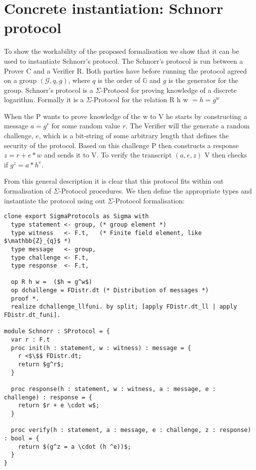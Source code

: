 \section{Concrete instantiation: Schnorr protocol}
\label{sec:schnorr}
To show the workability of the proposed formalisation we show that it can be
used to instantiate Schnorr's protocol.
The Schnorr's protocol is run between a Prover C and a
Verifier R. Both parties have before running the protocol agreed on a group
$(\mathcal{G}, q, g)$, where $q$ is the order of $\mathbb{G}$ and $g$ is the
generator for the group.
Schnorr's protocol is a $\Sigma$-Protocol for proving knowledge of a discrete
logarithm. Formally it is a $\Sigma$-Protocol for the relation R h w $= h = g^{w}$

When the P wants to prove knowledge of the w to V he starts by
constructing a message $a = g^{r}$ for some random value $r$. The Verifier will
the generate a random challenge, $e$, which is a bit-string of some arbitrary length
that defines the security of the protocol.
Based on this challenge P then constructs a response $z = r + e * w$ and sends
it to V.
To verify the transcript $(a,e,z)$ V then checks if $g^{z} = a * h^{e}$.

From this general description it is clear that this protocol fits within out
formalisation of $\Sigma$-Protocol procedures. We then define the appropriate
types and instantiate the protocol using out $\Sigma$-Protocol formalisation:

\begin{lstlisting}[mathescape,label=lst:sigma:schnorr,caption=Schnorr instantiation]
clone export SigmaProtocols as Sigma with
  type statement <- group, (* group element *)
  type witness   <- F.t,   (* Finite field element, like $\mathbb{Z}_{q}$ *)
  type message   <- group,
  type challenge <- F.t,
  type response  <- F.t,

  op R h w =  ($h = g^w$)
  op dchallenge = FDistr.dt (* Distribution of messages *)
  proof *.
  realize dchallenge_llfuni. by split; [apply FDistr.dt_ll | apply FDistr.dt_funi].

module Schnorr : SProtocol = {
  var r : F.t
  proc init(h : statement, w : witness) : message = {
    r <$\$$ FDistr.dt;
    return $g^r$;
  }

  proc response(h : statement, w : witness, a : message, e : challenge) : response = {
    return $r + e \cdot w$;
  }

  proc verify(h : statement, a : message, e : challenge, z : response) : bool = {
    return $(g^z = a \cdot (h ^e))$;
  }
}
\end{lstlisting}

